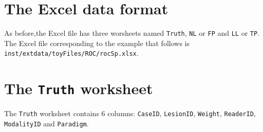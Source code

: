 \documentclass[]{book}
\begin{document}
\hypertarget{the-excel-data-format-2}{%
\section{The Excel data format}\label{the-excel-data-format-2}}

As before,the Excel file has three worsheets named \texttt{Truth}, \texttt{NL} or \texttt{FP} and \texttt{LL} or \texttt{TP}. The Excel file corresponding to the example that follows is \texttt{inst/extdata/toyFiles/ROC/rocSp.xlsx}.

\hypertarget{the-truth-worksheet-2}{%
\section{\texorpdfstring{The \texttt{Truth} worksheet}{The Truth worksheet}}\label{the-truth-worksheet-2}}

The \texttt{Truth} worksheet contains 6 columns: \texttt{CaseID}, \texttt{LesionID}, \texttt{Weight}, \texttt{ReaderID}, \texttt{ModalityID} and \texttt{Paradigm}.
\end{document}
